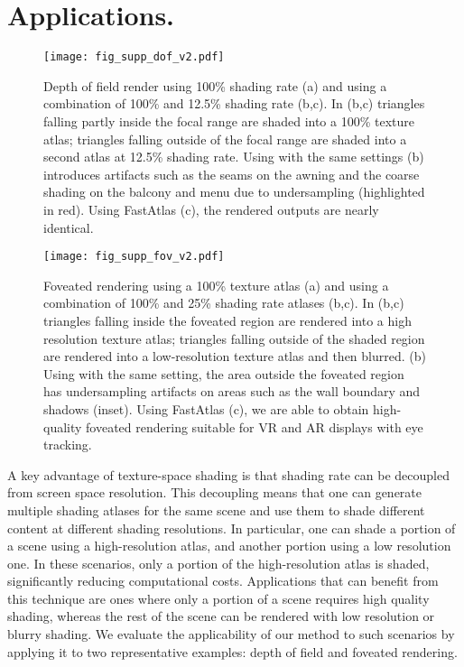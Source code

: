 \section{Applications.}

\begin{figure*}
\texttt{[image: fig\_supp\_dof\_v2.pdf]}
\caption{Depth of field render using 100\% shading rate (a) and using a combination of 100\% and 12.5\% shading rate (b,c). In (b,c) triangles falling partly inside the focal range are shaded into a 100\% texture atlas; triangles falling outside of the focal range are shaded into a second atlas at 12.5\% shading rate. Using \cite{Neff2022MSA} with the same settings (b) introduces artifacts such as the seams on the awning and the coarse shading on the balcony and menu due to undersampling (highlighted in red). Using FastAtlas (c), the rendered outputs are nearly identical.} 
\label{fig:depthOfField}
\end{figure*}


\begin{figure*}
\texttt{[image: fig\_supp\_fov\_v2.pdf]}
\caption{Foveated rendering using a 100\% texture atlas (a) and using a combination of 100\% and 25\% shading rate atlases (b,c). In (b,c) triangles falling inside the foveated region are rendered into a high resolution texture atlas; triangles falling outside of the shaded region are rendered into a low-resolution texture atlas and then blurred. (b) Using \cite{Neff2022MSA} with the same setting, the area outside the foveated region has undersampling artifacts on areas such as the wall boundary and shadows (inset). Using FastAtlas (c), we are able to obtain high-quality foveated rendering suitable for VR and AR displays with eye tracking.}
\label{fig:foveated_rendering}
\end{figure*}


\label{sec:applications}
A key advantage of texture-space shading is that shading rate can be decoupled from screen space resolution. This decoupling means that one can generate multiple shading atlases for the same scene and use them to shade different content at different shading resolutions. In particular, one can shade a portion of a scene using a high-resolution atlas, and another portion using a low resolution one. In these scenarios, only a portion of the high-resolution atlas is shaded, significantly reducing computational costs.
Applications that can benefit from this technique are ones where only a portion of a scene requires high quality shading, whereas the rest of the 
scene can be rendered with low resolution or blurry shading. We evaluate the applicability of our method to such scenarios by applying it to two representative examples: depth of field and foveated rendering. 
 
